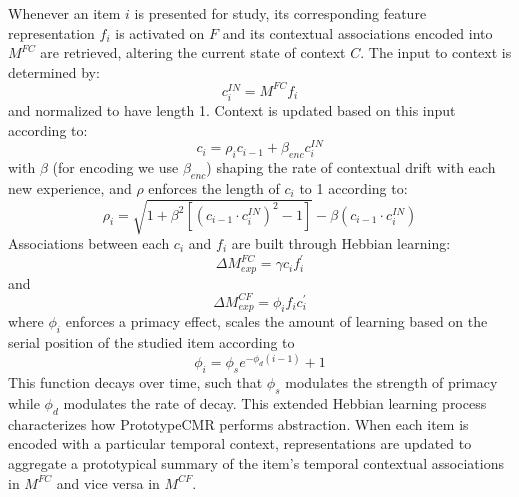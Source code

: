 {}Whenever an item $i$ is presented for study, its corresponding feature representation $f_i$ is activated on $F$ and its contextual associations encoded into $M^{FC}$ are retrieved, altering the current state of context $C$.\markdownRendererInterblockSeparator
{}The input to context is determined by:\markdownRendererInterblockSeparator
{}\begin{equation} \label{eq:3} c^{IN}_{i} = M^{FC}f_{i} \end{equation}\markdownRendererInterblockSeparator
{}and normalized to have length 1. Context is updated based on this input according to:\markdownRendererInterblockSeparator
{}\begin{equation} \label{eq:4} c_i = \rho_ic_{i-1} + \beta_{enc} c_{i}^{IN} \end{equation}\markdownRendererInterblockSeparator
{}with $\beta$ (for encoding we use $\beta_{enc}$) shaping the rate of contextual drift with each new experience, and $\rho$ enforces the length of $c_i$ to 1 according to:\markdownRendererInterblockSeparator
{}\begin{equation} \rho_i = \sqrt{1 + \beta^2\left[\left(c_{i-1} \cdot c^{IN}_i\right)^2 - 1\right]} - \beta\left(c_{i-1} \cdot c^{IN}_i\right) \label{eq:5} \end{equation}\markdownRendererInterblockSeparator
{}Associations between each $c_i$ and $f_i$ are built through Hebbian learning:\markdownRendererInterblockSeparator
{}\begin{equation} \label{eq:6 }\Delta M^{FC}_{exp} = \gamma c_i f^{'}_i \end{equation}\markdownRendererInterblockSeparator
{}and\markdownRendererInterblockSeparator
{}\begin{equation} \label{eq:7} \Delta M^{CF}_{exp} = \phi_i f_i c^{'}_i \end{equation}\markdownRendererInterblockSeparator
{}where $\phi_i$ enforces a primacy effect, scales the amount of learning based on the serial position of the studied item according to\markdownRendererInterblockSeparator
{}\begin{equation} \label{eq:8} \phi_i = \phi_se^{-\phi_d(i-1)} + 1 \end{equation}\markdownRendererInterblockSeparator
{}This function decays over time, such that $\phi_{s}$ modulates the strength of primacy while $\phi_{d}$ modulates the rate of decay.\markdownRendererInterblockSeparator
{}This extended Hebbian learning process characterizes how PrototypeCMR performs abstraction. When each item is encoded with a particular temporal context, representations are updated to aggregate a prototypical summary of the item's temporal contextual associations in $M^{FC}$ and vice versa in $M^{CF}$. \markdownRendererInterblockSeparator
